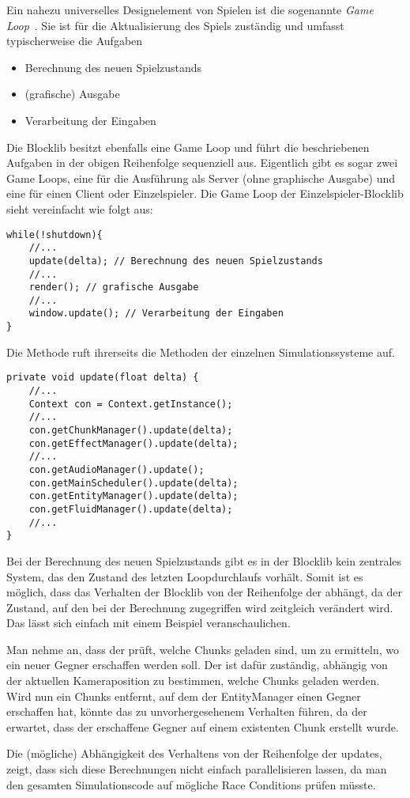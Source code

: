 Ein nahezu universelles Designelement von Spielen ist die sogenannte \emph{Game Loop}~\cite[S.~161~ff.]{Nystrom2015}. Sie ist für die Aktualisierung des Spiels zuständig und umfasst typischerweise die Aufgaben 
\begin{itemize}
  \item Berechnung des neuen Spielzustands
  \item (grafische) Ausgabe
  \item Verarbeitung der Eingaben
\end{itemize}
Die Blocklib besitzt ebenfalls eine Game Loop und führt die beschriebenen Aufgaben in der obigen Reihenfolge sequenziell aus. Eigentlich gibt es sogar zwei Game Loops, eine für die Ausführung als Server (ohne graphische Ausgabe) und eine für einen Client oder Einzelspieler. Die Game Loop der Einzelspieler-Blocklib sieht vereinfacht wie folgt aus:
\begin{lstlisting}
while(!shutdown){
	//...
	update(delta); // Berechnung des neuen Spielzustands
	//...
	render(); // grafische Ausgabe
	//...
	window.update(); // Verarbeitung der Eingaben
}
\end{lstlisting}

Die Methode  ruft ihrerseits die  Methoden der einzelnen Simulationssysteme auf.
\begin{lstlisting}
private void update(float delta) {
	//...
	Context con = Context.getInstance();
	//...
	con.getChunkManager().update(delta);
	con.getEffectManager().update(delta);
	//...
	con.getAudioManager().update();
	con.getMainScheduler().update(delta);
	con.getEntityManager().update(delta);
	con.getFluidManager().update(delta);
	//...
}
\end{lstlisting}
Bei der Berechnung des neuen Spielzustands gibt es in der Blocklib kein zentrales System, das den Zustand des letzten Loopdurchlaufs vorhält. Somit ist es möglich, dass das Verhalten der Blocklib von der Reihenfolge der  abhängt, da der Zustand, auf den bei der Berechnung zugegriffen wird zeitgleich verändert wird. Das lässt sich einfach mit einem Beispiel veranschaulichen. 

Man nehme an, dass der  prüft, welche Chunks geladen sind, um zu ermitteln, wo ein neuer Gegner erschaffen werden soll. Der  ist dafür zuständig, abhängig von der aktuellen Kameraposition zu bestimmen, welche Chunks geladen werden. Wird nun ein Chunks entfernt, auf dem der EntityManager einen Gegner erschaffen hat, könnte das zu unvorhergesehenem Verhalten führen, da der  erwartet, dass der erschaffene Gegner auf einem existenten Chunk erstellt wurde.

Die (mögliche) Abhängigkeit des Verhaltens von der Reihenfolge der updates, zeigt, dass sich diese Berechnungen nicht einfach parallelisieren lassen, da man den gesamten Simulationscode auf mögliche Race Conditions prüfen müsste.